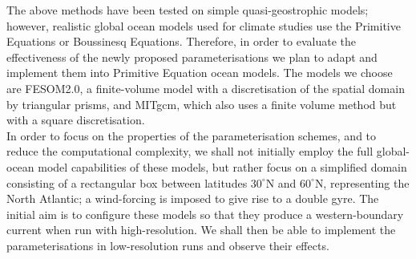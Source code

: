 \indnt The above methods have been tested on simple quasi-geostrophic models; however, realistic global ocean models used for climate studies use the Primitive Equations or Boussinesq Equations. Therefore, in order to evaluate the effectiveness of the newly proposed parameterisations we plan to adapt and implement them into Primitive Equation ocean models. The models we choose are FESOM2.0, a finite-volume model with a discretisation of the spatial domain by triangular prisms, and MITgcm, which also uses a finite volume method but with a square discretisation. \\
\indnt In order to focus on the properties of the parameterisation schemes, and to reduce the computational complexity, we shall not initially employ the full global-ocean model capabilities of these models, but rather focus on a simplified domain consisting of a rectangular box between latitudes $30^{\circ}$N and $60^{\circ}$N, representing the North Atlantic; a wind-forcing is imposed to give rise to a double gyre. The initial aim is to configure these models so that they produce a western-boundary current when run with high-resolution. We shall then be able to implement the parameterisations in low-resolution runs and observe their effects. 